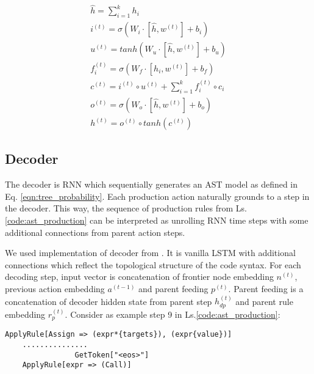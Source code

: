 \begin{equation}
\begin{gathered}
    \hat{h} = \sum^{k}_{i=1}h_i \\
    
    i^{(t)} = \sigma(W_i\cdot[\hat{h}, w^{(t)}]+b_i) \\
    
    u^{(t)} = tanh(W_u\cdot[\hat{h}, w^{(t)}]+b_u) \\
    
    f^{(t)}_i = \sigma(W_{f}\cdot [h_i, w^{(t)}] + b_f) \\
    
    c^{(t)} = i^{(t)} \circ u^{(t)} + \sum_{i=1}^{k} f^{(t)}_i \circ c_i \\
    
    o^{(t)} = \sigma(W_o\cdot[\hat{h}, w^{(t)}]+b_o) \\
    
    h^{(t)} = o^{(t)} \circ tanh(c^{(t)})

\end{gathered}
\label{eq:tree_lstm}
\end{equation}

\subsection{Decoder}
The decoder is RNN which sequentially generates an AST model as defined in Eq. \ref{eqn:tree_probability}. Each production action naturally grounds to a step in the decoder. This way, the sequence of production rules from Ls. \ref{code:ast_production} can be interpreted as unrolling RNN time steps with some additional connections from parent action steps.

We used implementation of decoder from \cite{Yin2017}. It is vanilla LSTM with additional connections which reflect the topological structure of the code syntax. For each decoding step, input vector is concatenation of frontier node embedding $n^{(t)}$, previous action embedding $a^{(t-1)}$ and parent feeding $p^{(t)}$. Parent feeding is a concatenation of decoder hidden state from parent step $h_{dp}^{(t)}$ and parent rule embedding $r_p^{(t)}$. Consider as example step 9 in Ls.\ref{code:ast_production}: 
    
\begin{verbatim}
ApplyRule[Assign => (expr*{targets}), (expr{value})]
    ...............
                GetToken["<eos>"]
    ApplyRule[expr => (Call)]
\end{verbatim}

